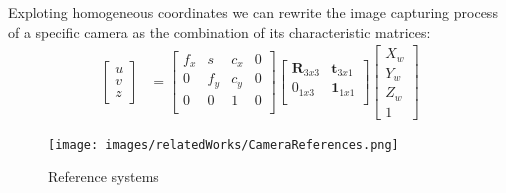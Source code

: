 Exploting homogeneous coordinates we can rewrite the image capturing 
process of a specific camera as the combination of its characteristic matrices:
\begin{align*}
    \begin{bmatrix}
        u \\
        v \\
        z
      \end{bmatrix}
    &= \begin{bmatrix}
        f_{x} & s & c_{x} & 0 \\
        0 & f_{y} & c_{y} & 0\\
        0 & 0     & 1     & 0\\
      \end{bmatrix} \begin{bmatrix}
        \textbf{R}_{3x3} & \textbf{t}_{3x1}  \\
        0_{1x3} & \textbf{1}_{1x1}  \\
      \end{bmatrix}
      \begin{bmatrix}
        X_w \\
        Y_w \\
        Z_w \\
        1    
      \end{bmatrix}
  \end{align*}


  \begin{figure}
    \centering
    \texttt{[image: images/relatedWorks/CameraReferences.png]} %
    \caption{Reference systems}
    \label{fig:reference_systems}
  \end{figure}






